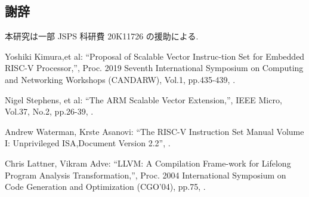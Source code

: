 \documentclass[a4paper,9pt, twocolumn]{jarticle}
\renewcommand{\baselinestretch}{0.87}   %
\begin{document}
\renewcommand{\baselinestretch}{0.83}\selectfont
\subsection*{\small 謝辞}
\vspace{-0.5mm}
{\small 本研究は一部 JSPS 科研費 20K11726 の援助による.}


%
%
\begin{thebibliography}{9}
\itemsep -1.7pt

{\small Yoshiki Kimura,et al:      %
\newblock ``Proposal of Scalable Vector Instruc-tion Set for Embedded RISC-V Processor,'',
\newblock Proc. 2019 Seventh International Symposium on Computing and Networking Workshops (CANDARW),
\newblock Vol.1,
\newblock pp.435-439,
.}

{\small Nigel Stephens, et al:      %
\newblock ``The ARM Scalable Vector Extension,'',
\newblock IEEE Micro,
\newblock Vol.37,
\newblock No.2,
\newblock pp.26-39,
.}

{\small Andrew Waterman, Krste Asanovi:      %
\newblock ``The RISC-V Instruction Set Manual Volume I: Unprivileged ISA,Document Version 2.2'',
.}

{\small Chris Lattner, Vikram Adve:      %
\newblock ``LLVM: A Compilation Frame-work for Lifelong Program Analysis Transformation,'',
\newblock Proc. 2004 International Symposium on Code Generation and Optimization (CGO’04),
\newblock pp.75,
.}

\end{thebibliography}
\end{document}
